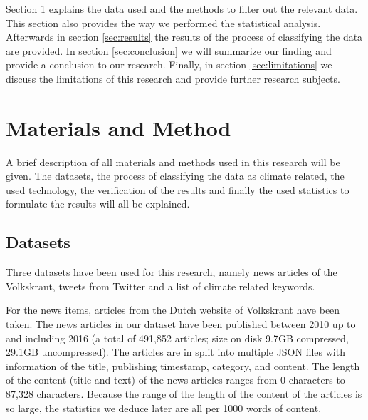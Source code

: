 \documentclass[paper=a4, fontsize=9px]{scrartcl} %
\numberwithin{equation}{section} %
\numberwithin{figure}{section} %
\numberwithin{table}{section} %
\begin{document}
\begin{multicols}{2}
Section \ref{sec:method} explains the data used and the methods to filter out the relevant data. This section also provides the way we performed the statistical analysis.
Afterwards in section \ref{sec:results} the results of the process of classifying the data are provided. In section \ref{sec:conclusion} we will summarize our finding and provide a conclusion to our research. Finally, in section \ref{sec:limitations} we discuss the limitations of this research and provide further research subjects.


\section{Materials and Method}\label{sec:method}

A brief description of all materials and methods used in this research will be given. The datasets, the process of classifying the data as climate related, the used technology, the verification of the results and finally the used statistics to formulate the results will all be explained.


\subsection{Datasets}

Three datasets have been used for this research, namely news articles of the Volkskrant, tweets from Twitter and a list of climate related keywords.

For the news items, articles from the Dutch website of Volkskrant have been taken. The news articles in our dataset have been published between 2010 up to and including 2016 (a total of 491,852 articles; size on disk 9.7GB compressed, 29.1GB uncompressed). The articles are in split into multiple JSON files with information of the title, publishing timestamp, category, and content. The length of the content (title and text) of the news articles ranges from 0 characters to 87,328 characters. Because the range of the length of the content of the articles is so large, the statistics we deduce later are all per 1000 words of content. 



\end{multicols}
\end{document}

